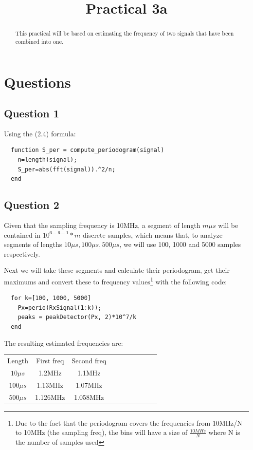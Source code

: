 \documentclass[conference,9pt]{IEEEtran}
\begin{document}
\title{Practical 3a}

\author{
}


\maketitle
\begin{abstract}
This practical will be based on estimating the frequency of two signals that have been combined into one.
\end{abstract}

\section{Questions}

\subsection{Question 1}
Using the (2.4) formula:
\begin{verbatim}
  function S_per = compute_periodogram(signal)
    n=length(signal);
    S_per=abs(fft(signal)).^2/n;
  end
\end{verbatim}


\subsection{Question 2}

Given that the sampling frequency is 10MHz, a segment of length $m \mu s$ will be contained in $10^{6-6+1}*m$ discrete samples, which means that, to analyze segments of lengths $10\mu s, 100\mu s, 500\mu s$, we will use 100, 1000 and 5000 samples respectively.

Next we will take these segments and calculate their periodogram, get their maximums and convert these to frequency values\footnote{Due to the fact that the periodogram covers the frequencies from 10MHz/N to 10MHz (the sampling freq), the bins will have a size of $\frac{10MHz}{N}$ where N is the number of samples used} with the following code:
\begin{verbatim}
  for k=[100, 1000, 5000]
    Px=perio(RxSignal(1:k));
    peaks = peakDetector(Px, 2)*10^7/k
  end
\end{verbatim}

The resulting estimated frequencies are:
\begin{center}
  \begin{tabular}{ c c c c c c c c c c }
    Length & First freq & Second freq \\
    $10\mu s$ & 1.2MHz & 1.1MHz \\
    $100\mu s$ & 1.13MHz & 1.07MHz \\
    $500\mu s$ & 1.126MHz & 1.058MHz \\ 
  \end{tabular}
\end{center}
\end{document}
